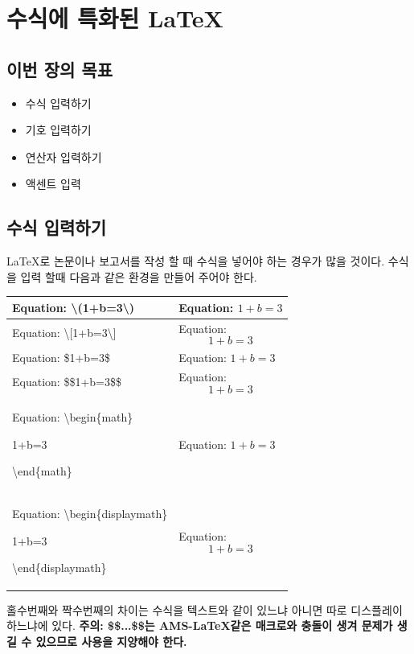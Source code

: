 \documentclass[12pt]{article}
\begin{document}
	\section{수식에 특화된 \LaTeX}
	\subsection{이번 장의 목표}
	\begin{itemize}
		\item 수식 입력하기
		\item 기호 입력하기
		\item 연산자 입력하기
		\item 액센트 입력
	\end{itemize}
	\subsection{수식 입력하기}
	\LaTeX 로 논문이나 보고서를 작성 할 때 수식을 넣어야 하는 경우가 많을 것이다. 수식을 입력 할때 다음과 같은 환경을 만들어 주어야 한다.\newline
	
	\begin{tabularx}{\textwidth \onehalfspacing}{|X|X|}
		\hline
		Equation: \textbackslash (1+b=3\textbackslash ) & Equation: \(1+b=3\)\\
		\hline
		Equation: \textbackslash[1+b=3\textbackslash] & Equation: \[1+b=3\]\\
		\hline
		Equation: \$1+b=3\$ & Equation: $1+b=3$\\
		\hline
		Equation: \$\$1+b=3\$\$ & Equation: $$1+b=3$$\\
		\hline
		Equation:
		\textbackslash begin\{math\}
		
		1+b=3
		
		\textbackslash end\{math\} & 
		Equation:
		\begin{math}
		1+b=3
		\end{math}\\
		\hline
		Equation:
		\textbackslash begin\{displaymath\}
		
		1+b=3
		
		\textbackslash end\{displaymath\} & 
		Equation:
		\begin{displaymath}
		1+b=3
		\end{displaymath}\\
		\hline
	\end{tabularx}
	\newline
	\newline
	홀수번째와 짝수번째의 차이는 수식을 텍스트와 같이 있느냐 아니면 따로 디스플레이 하느냐에 있다. \newline
	{\bf 주의: \$\$...\$\$는 AMS-\LaTeX 같은 매크로와 충돌이 생겨 문제가 생길 수 있으므로 사용을 지양해야 한다.}\clearpage
\end{document}
